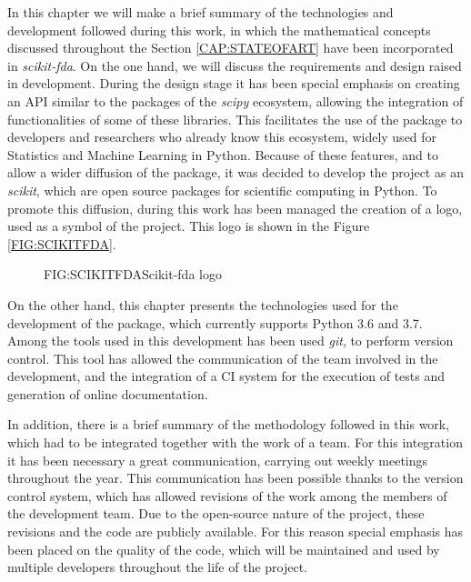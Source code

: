 
In this chapter we will make a brief summary of the technologies and development
followed during this work, in which the mathematical concepts discussed
throughout the Section \ref{CAP:STATEOFART} have been incorporated in
\textit{scikit-fda}. On the one hand, we will discuss the requirements and
design raised in development. During the design stage it has been special
emphasis on creating an \acs{API} similar to the packages of the \textit{scipy}\cite{scipy} ecosystem, allowing
the integration of functionalities of some of these libraries. This facilitates the use
of the package to developers and researchers who already know this ecosystem,
widely used for Statistics and Machine Learning in Python. Because of these
features, and to allow a wider diffusion of the package, it was decided to
develop the project as an \textit{scikit}, which are open source packages for
scientific computing in Python.
To promote this diffusion, during this work has been managed the creation of a
logo, used as a symbol of the project. This logo is shown in the Figure
\ref{FIG:SCIKITFDA}.

\begin{figure}[Scikit-fda logo]{FIG:SCIKITFDA}{Scikit-fda logo}
\end{figure}

On the other hand, this chapter presents the technologies used for the development of
the package, which currently supports Python 3.6 and 3.7.
Among the tools used in this development has been used \textit{git},
to perform version control. This tool has allowed the communication of the team
involved in the development, and the integration of a \ac{CI}
system for the execution of tests and generation of online documentation.

In addition, there is a brief summary of the methodology followed in this work,
which had to be integrated together with the work of a team.
For this integration it has been necessary a great communication,
carrying out weekly meetings throughout the year. This communication has
been possible thanks to the version control system, which has allowed
revisions of the work among the members of the development team.
Due to the open-source nature of the project, these revisions and the code
are publicly available. For this reason special emphasis has been placed on
the quality of the code, which will be maintained and used by multiple
developers throughout the life of the project.
